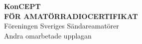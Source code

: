 \AddToShipoutPicture*{\BackgroundPic}

\pagestyle{empty}



\onecolumn
\vspace{3cm}
\begin{center}
{\fontsize{2.4cm}{2.88cm}\bfseries{\color{white}KonCEPT}} \\[2ex]
\Large{\bfseries{\color{white}FÖR AMATÖRRADIOCERTIFIKAT}} \\[2ex]
\huge{\color{white}Föreningen Sveriges Sändareamatörer} \\
\Large{\color{white}Andra omarbetade upplagan}
\end{center}

\clearpage

